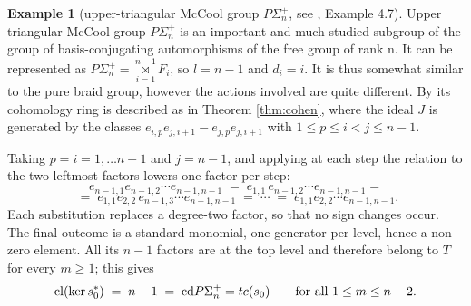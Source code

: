 \documentclass[11pt]{amsart}
\theoremstyle{plain}
\theoremstyle{definition}
\newtheorem{remark}[theorem]{Remark}
\newtheorem{example}[theorem]{Example}
\newcommand{\Ker}{\mathop{\rm Ker}\nolimits}
\newcommand{\cl}{\mathop{\rm cl}\nolimits}
\newcommand{\secat}{\mathop{\rm secat}\nolimits}
\newcommand{\tc}{\mathop{\rm tc}\nolimits}
\newcommand{\TC}{\mathop{\rm TC}\nolimits}
\newcommand{\cd}{\mathrm{cd}}
\newcommand{\bigrt}{\mathop{\rtimes}\limits}
\newcommand{\rt}{\rtimes}
\begin{document}
\begin{example}[upper-triangular McCool group $P\Sigma_n^{+}$, see \cite{Cohen}, Example 4.7]
Upper triangular McCool group $P\Sigma_n^{+}$ is an important and much studied subgroup 
of the group of basis-conjugating automorphisms of the free group of rank n. It can be represented 
as $P\Sigma_n^{+}=\bigrt_{i=1}^{n-1}F_i$, so $l=n-1$ and $d_i=i$. It is thus somewhat similar to the 
pure braid group, however the actions involved are quite different. By  \cite[Ex.~4.7]{Cohen} its 
cohomology ring is described as in Theorem \ref{thm:cohen}, where 
the ideal $J$ is generated by the classes $e_{i,p}e_{j,i+1}-e_{j,p}e_{j,i+1}$ with $1\le p\le i<j\le n-1$. 

Taking $p=i=1,\dots n-1$ and $j=n-1$, and applying at each
step  the relation to the two leftmost factors lowers one factor per step:
$$  e_{n-1,1}e_{n-1,2}\cdots e_{n-1,n-1}   \;=\;e_{1,1}\,e_{n-1,2}\cdots e_{n-1,n-1}=$$
$$  \;=\;e_{1,1}e_{2,2}\,e_{n-1,3}\cdots e_{n-1,n-1}   \;=\;\cdots\;=\;e_{1,1}e_{2,2}\cdots e_{n-1,n-1}. $$
Each substitution replaces a degree-two factor, so that no sign changes occur. The final
outcome is a standard monomial, one generator per level, hence a non-zero element. All its $n-1$
factors are at the top level and therefore belong to $T$ for every $m\ge1$; this gives
$$   \cl (\ker s_0^*)\;=\;n-1\;=\;\cd P\Sigma_n^{+}=tc(s_0)   \qquad\text{for all } 1\le m\le n-2 .$$
\end{example}
 



%
\end{document}
